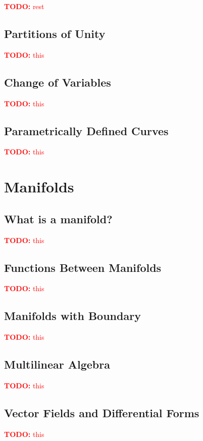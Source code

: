 \documentclass{article}
\newcommand{\TODO}[1]{\textcolor{red}{\textbf{TODO:} #1}}
\begin{document}
\begin{enumerate}
\TODO{rest}

\subsection{Partitions of Unity}

\TODO{this}

\subsection{Change of Variables}

\TODO{this}

\subsection{Parametrically Defined Curves}

\TODO{this}

\section{Manifolds}

\subsection{What is a manifold?}

\TODO{this}

\subsection{Functions Between Manifolds}

\TODO{this}

\subsection{Manifolds with Boundary}

\TODO{this}

\subsection{Multilinear Algebra}

\TODO{this}

\subsection{Vector Fields and Differential Forms}

\TODO{this}


\end{enumerate}
\end{document}
